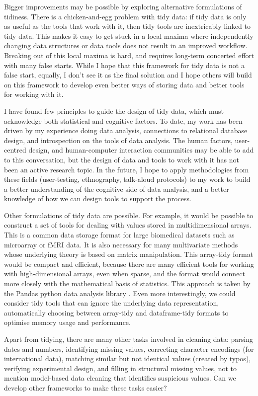 \documentclass[article]{jss}
\begin{document}
Bigger improvements may be possible by exploring alternative formulations of tidiness. There is a chicken-and-egg problem with tidy data: if tidy data is only as useful as the tools that work with it, then tidy tools are inextricably linked to tidy data. This makes it easy to get stuck in a local maxima where independently changing data structures or data tools does not result in an improved workflow. Breaking out of this local maxima is hard, and requires long-term concerted effort with many false starts. While I hope that this framework for tidy data is not a false start, equally, I don't see it as the final solution and I hope others will build on this framework to develop even better ways of storing data and better tools for working with it.

I have found few principles to guide the design of tidy data, which must acknowledge both statistical and cognitive factors. To date, my work has been driven by my experience doing data analysis, connections to relational database design, and introspection on the tools of data analysis. The human factors, user-centred design, and human-computer interaction communities may be able to add to this conversation, but the design of data and tools to work with it has not been an active research topic. In the future, I hope to apply methodologies from these fields (user-testing, ethnography, talk-aloud protocols) to my work to build a better understanding of the cognitive side of data analysis, and a better knowledge of how we can design tools to support the process.

Other formulations of tidy data are possible. For example, it would be possible to construct a set of tools for dealing with values stored in multidimensional arrays. This is a common data storage format for large biomedical datasets such as microarray or fMRI data. It is also necessary for many multivariate methods whose underlying theory is based on matrix manipulation. This array-tidy format would be compact and efficient, because there are many efficient tools for working with high-dimensional arrays, even when sparse, and the format would connect more closely with the mathematical basis of statistics. This approach is taken by the Pandas python data analysis library \citep{mckinney:2010}. Even more interestingly, we could consider tidy tools that can ignore the underlying data representation, automatically choosing between array-tidy and dataframe-tidy formats to optimise memory usage and performance.

Apart from tidying, there are many other tasks involved in cleaning data: parsing dates and numbers, identifying missing values, correcting character encodings (for international data), matching similar but not identical values (created by typos), verifying experimental design, and filling in structural missing values, not to mention model-based data cleaning that identifies suspicious values. Can we develop other frameworks to make these tasks easier?
\end{document}
